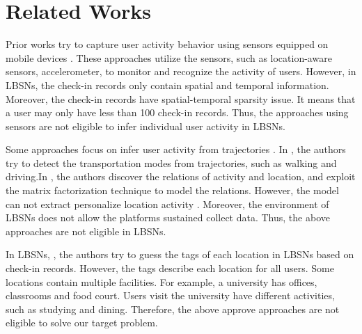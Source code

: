 \chapter{Related Works}
\label{sec:2}


Prior works try to capture user activity behavior using sensors equipped on mobile devices \cite{11_UbiComp_Lane}\cite{14_UbiComp_Lane}. These approaches \cite{11_UbiComp_Lane}\cite{14_UbiComp_Lane} utilize the sensors, such as location-aware sensors, accelerometer, to monitor and recognize the activity of users. However, in LBSNs, the check-in records only contain spatial and temporal information. Moreover, the check-in records have spatial-temporal sparsity issue. It means that a user may only have less than 100 check-in records. Thus, the approaches using sensors \cite{11_UbiComp_Lane}\cite{14_UbiComp_Lane} are not eligible to infer individual user activity in LBSNs.


Some approaches focus on infer user activity from trajectories \cite{08_UbiComp_Zheng}\cite{10_WWW_Zheng}\cite{04_AAAI_Liao}\cite{03_UbiComp_Patterson}. In \cite{03_UbiComp_Patterson}\cite{08_UbiComp_Zheng}, the authors try to detect the transportation modes from trajectories, such as walking and driving.In \cite{10_WWW_Zheng}, the authors discover the relations of activity and location, and exploit the matrix factorization technique to model the relations. However, the model can not extract personalize location activity . Moreover, the environment of LBSNs does not allow the platforms sustained collect data. Thus, the above approaches are not eligible in LBSNs.


In LBSNs, \cite{11_KDD_Ye}, the authors try to guess the tags of each location in LBSNs based on check-in records. However, the tags describe each location for all users. Some locations contain multiple facilities. For example, a university has offices, classrooms and food court. Users visit the university have different activities, such as studying and dining. Therefore, the above approve approaches \cite{08_UbiComp_Zheng}\cite{10_WWW_Zheng}\cite{11_KDD_Ye} are not eligible to solve our target problem.


